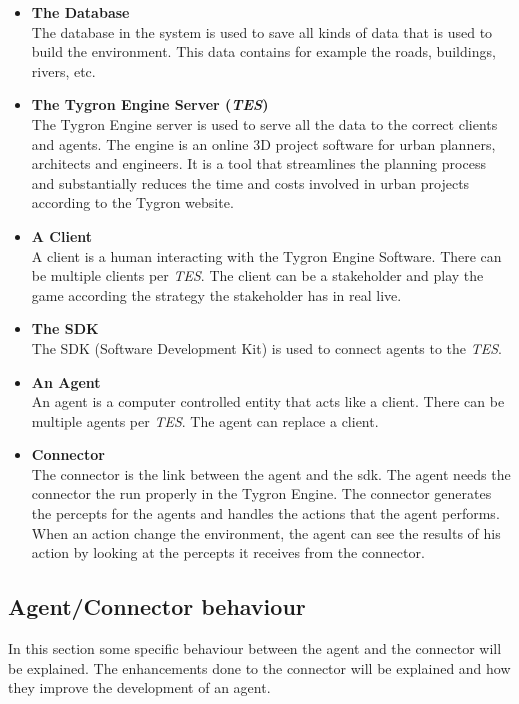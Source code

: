 \begin{itemize}
	\item \textbf{The Database} \\ 
	The database in the system is used to save all kinds of data that is used to build the environment. This data contains for example the roads, buildings, rivers, etc.
	\item \textbf{The Tygron Engine Server (\textit{TES})} \\ 
	The Tygron Engine server is used to serve all the data to the correct clients and agents. The engine is an online 3D project software for urban planners, architects and engineers. It is a tool that streamlines the planning process and substantially reduces the time and costs involved in urban projects according to the Tygron website.
	\item \textbf{A Client} \\
	A client is a human interacting with the Tygron Engine Software. There can be multiple clients per \textit{TES}. The client can be a stakeholder and play the game according the strategy the stakeholder has in real live. 
	\item \textbf{The SDK} \\
	The SDK (Software Development Kit) is used to connect agents to the \textit{TES}.
	\item \textbf{An Agent} \\
	An agent is a computer controlled entity that acts like a client. There can be multiple agents per \textit{TES}. The agent can replace a client.
	\item \textbf{Connector} \\
	The connector is the link between the agent and the sdk. The agent needs the connector the run properly in the Tygron Engine. The connector generates the percepts for the agents and handles the actions that the agent performs. When an action change the environment, the agent can see the results of his action by looking at the percepts it receives from the connector.
\end{itemize}

\newpage
\subsection{Agent/Connector behaviour}
In this section some specific behaviour between the agent and the connector will be explained. The enhancements done to the connector will be explained and how they improve the development of an agent.

